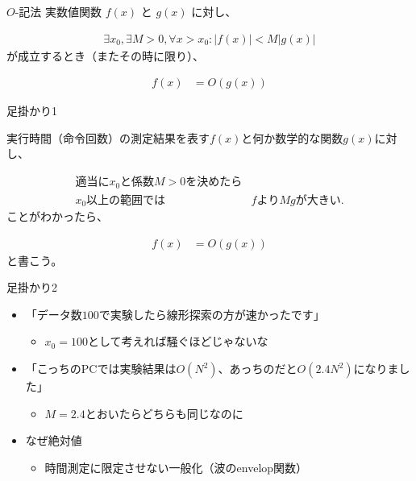 \documentclass{beamer}
\begin{document}
\begin{frame}[fragile]{$O$-記法}{}
実数値関数 $f(x)$ と $g(x)$ に対し、

\begin{align*}
\exists x_{0}, \exists M > 0,  \forall x > x_{0} : |f(x)| < M | g(x) |
\end{align*}
が成立するとき（またその時に限り）、

\begin{align*}
f(x) &= O(g(x))
\end{align*}
\end{frame}

\begin{frame}[fragile]{足掛かり1}{}

実行時間（命令回数）の測定結果を表す$f(x)$と何か数学的な関数$g(x)$に対し、

\begin{align*}
適当に x_{0}と係数M > 0を決めたら & \\
x_{0}以上の範囲では& fより M g が大きい.
\end{align*}
ことがわかったら、

\begin{align*}
f(x) &= O(g(x))
\end{align*}
と書こう。
\end{frame}

\begin{frame}[fragile]{足掛かり2}{}

\begin{itemize}\itemsep20pt
\item 「データ数$100$で実験したら線形探索の方が速かったです」
\begin{itemize}
\item $x_{0} = 100$として考えれば騒ぐほどじゃないな
\end{itemize}
\item 「こっちのPCでは実験結果は$O(N^2)$、あっちのだと$O(2.4N^2)$になりました」
\begin{itemize}
\item $M=2.4$とおいたらどちらも同じなのに
\end{itemize}
\item なぜ絶対値
\begin{itemize}%
\item 時間測定に限定させない一般化（波のenvelop関数）
\end{itemize}
\end{itemize}
\end{frame}
\end{document}
